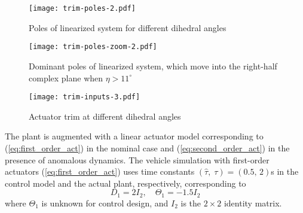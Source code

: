 \begin{figure}[htbp]
	\centering
	\texttt{[image: trim-poles-2.pdf]}
	\caption{Poles of linearized system for different dihedral angles}
	\label{fig:trim-poles}
\end{figure}

\begin{figure}[htbp]
	\centering
	\texttt{[image: trim-poles-zoom-2.pdf]}
	\caption{Dominant poles of linearized system, which move into the right-half complex plane when $\eta > 11^\circ$}
	\label{fig:trim-poles-zoom}
\end{figure}

\begin{figure}[htbp]
	\centering
	\texttt{[image: trim-inputs-3.pdf]}
	\caption{Actuator trim at different dihedral angles}
	\label{fig:trim-inputs}
\end{figure}

The plant is augmented with a linear actuator model corresponding to (\ref{eq:first_order_act}) in the nominal case and (\ref{eq:second_order_act}) in the presence of anomalous dynamics. The vehicle simulation with first-order actuators (\ref{eq:first_order_act}) uses time constants $(\hat{\tau},\;\tau) = (0.5,\,2)$s in the control model and the actual plant, respectively, corresponding to
\begin{equation}
D_1 = 2 I_2, \quad \Theta_1 = -1.5 I_2
\end{equation}
where $\Theta_1$ is unknown for control design, and $I_2$ is the $2 \times 2$ identity matrix. 

